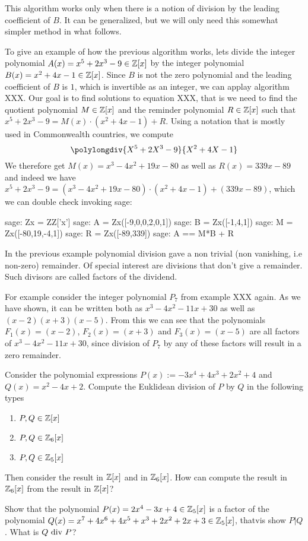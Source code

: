 This algorithm works only when there is a notion of division by the leading coefficient of $B$. It can be generalized, but we will only need this somewhat simpler method in what follows.
\begin{example} To give an example of how the previous algorithm works, lets divide the integer polynomial $A(x)=x^5+2x^3-9\in \mathbb{Z}[x]$ by the integer polynomial $B(x)=x^2+4x-1\in\mathbb{Z}[x]$. Since $B$ is not the zero polynomial and the leading coefficient of $B$ is $1$, which is invertible as an integer, we can applay algorithm XXX. Our goal is to find solutions to equation XXX, that is we need to find the quotient polynomial $M\in\mathbb{Z}[x]$ and the reminder polynomial $R \in \mathbb{Z}[x]$ such that $x^5+2x^3-9 = M(x)\cdot (x^2+4x-1) + R$. Using a notation that is mostly used in Commonwealth countries, we compute
\begin{equation}
\polylongdiv{X^5+2X^3-9}{X^2+4X-1}
\end{equation}
We therefore get $M(x)=x^3-4x^2+19x-80$ as well as $R(x)=339x-89$ and indeed we have $x^5+2x^3-9 = (x^3-4x^2+19x-80)\cdot (x^2+4x-1) + (339x-89)$, which we can double check invoking sage:
\begin{sagecommandline}
sage: Zx = ZZ['x']
sage: A = Zx([-9,0,0,2,0,1])
sage: B = Zx([-1,4,1])
sage: M = Zx([-80,19,-4,1])
sage: R = Zx([-89,339])
sage: A == M*B + R
\end{sagecommandline}
\end{example}
\begin{example} In the previous example polynomial division gave a non trivial (non vanishing, i.e non-zero) remainder. Of special interest are divisions that don't give a remainder. Such divisors are called factors of the dividend. 

For example consider the integer polynomial $P_7$ from example XXX again. As we have shown, it can be written both as $x^3 - 4 x^2 - 11 x + 30$ as well as $(x-2)(x + 3)(x-5)$. From this we can see that the polynomials $F_1(x)=(x-2)$, $F_2(x)=(x+3)$ and $F_3(x)=(x-5)$ are all factors of $x^3 - 4 x^2 - 11 x + 30$, since division of $P_7$ by any of these factors will result in a zero remainder.
\end{example}
\begin{exercise} Consider the polynomial expressions $P(x):= -3x^4 + 4x^3 + 2x^2 +4$ and $Q(x)= x^2-4x+2$. Compute the Euklidean division of $P$ by $Q$ in the following types
\begin{enumerate}
\item $P,Q\in \mathbb{Z}[x]$
\item $P,Q\in \mathbb{Z}_6[x]$
\item $P,Q\in \mathbb{Z}_5[x]$
\end{enumerate}
Then consider the result in $\mathbb{Z}[x]$ and in $\mathbb{Z}_6[x]$. How can compute the result in $\mathbb{Z}_6[x]$ from the result in $\mathbb{Z}[x]$?
\end{exercise}
\begin{exercise}
Show that the polynomial $P(x)= 2x^4-3x+4\in \mathbb{Z}_5[x]$ is a factor of the polynomial $Q(x)=x^7 + 4x^6 + 4x^5 + x^3 + 2x^2 + 2x + 3\in\mathbb{Z}_5[x]$, thatvis show $P|Q$. What is $Q \text{ div } P$?
\end{exercise}
